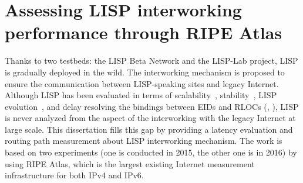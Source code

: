 
\chapter{Assessing LISP interworking performance through RIPE Atlas}
\label{cha:pxtr}
\ifpdf
    \graphicspath{{Chapter6/Pics/Raster/}{Chapter6/Pics/PDF/}{Chapter6/}}
\else
    \graphicspath{{Chapter6/Pics/Vector/}{Chapter6/}}
\fi

Thanks to two testbeds: the LISP Beta Network and the LISP-Lab project, LISP is gradually deployed in the wild. The interworking mechanism is proposed to ensure the communication between LISP-speaking sites and legacy Internet. %
Although LISP has been evaluated in terms of scalability~\cite{lispCCR}, stability~\cite{yue2016stability}, LISP evolution~\cite{li2017lisp}, and delay resolving the bindings between EIDs and RLOCs (\cite{lispCCR}, \cite{coras2014performance}), LISP is never analyzed from the aspect of the interworking with the legacy Internet at large scale. This dissertation fills this gap by providing a latency evaluation and routing path measurement about LISP interworking mechanism. The work is based on two experiments (one is conducted in 2015, the other one is in 2016) by using RIPE Atlas, which is the largest existing Internet measurement infrastructure for both IPv4 and IPv6. %

